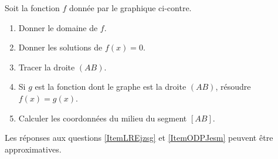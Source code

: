 
\begin{exercice}\label{exosmath-0006}

    \begin{multicols}{2}
    Soit la fonction \( f\) donnée par le graphique ci-contre.
        \begin{enumerate}
            \item
                Donner le domaine de \( f\).
            \item\label{ItemLREjzsg}
                Donner les solutions de \( f(x)=0\).
            \item 
                Tracer la droite \( (AB)\).
            \item\label{ItemODPJesm}
                Si \( g\) est la fonction dont le graphe est la droite \( (AB)\), résoudre \( f(x)=g(x)\).
            \item
                Calculer les coordonnées du milieu du segment \( [AB]\).
        \end{enumerate}


        \columnbreak


    \end{multicols}
    Les réponses aux questions \ref{ItemLREjzsg} et \ref{ItemODPJesm} peuvent être approximatives.
        

\end{exercice}
